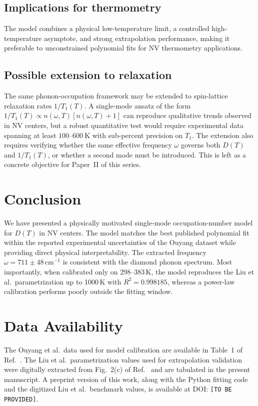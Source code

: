 \documentclass[12pt]{article}
\begin{document}
\subsection{Implications for thermometry}
The model combines a physical low-temperature limit, a controlled high-temperature asymptote, and strong extrapolation performance, making it preferable to unconstrained polynomial fits for NV thermometry applications.

\subsection{Possible extension to relaxation}
The same phonon-occupation framework may be extended to spin-lattice relaxation rates $1/T_1(T)$. A single-mode ansatz of the form $1/T_1(T) \propto n(\omega,T)[n(\omega,T)+1]$ can reproduce qualitative trends observed in NV centers, but a robust quantitative test would require experimental data spanning at least $100$--$600\ \text{K}$ with sub-percent precision on $T_1$. The extension also requires verifying whether the same effective frequency $\omega$ governs both $D(T)$ and $1/T_1(T)$, or whether a second mode must be introduced. This is left as a concrete objective for Paper~II of this series.

\section{Conclusion}
We have presented a physically motivated single-mode occupation-number model for $D(T)$ in NV centers. The model matches the best published polynomial fit within the reported experimental uncertainties of the Ouyang dataset while providing direct physical interpretability. The extracted frequency $\omega = 711 \pm 48\,\mathrm{cm}^{-1}$ is consistent with the diamond phonon spectrum. Most importantly, when calibrated only on 298--383\,K, the model reproduces the Liu et al.\ parametrization up to 1000\,K with $R^2 = 0.998185$, whereas a power-law calibration performs poorly outside the fitting window.

\section*{Data Availability}
The Ouyang et al.\ data used for model calibration are available in Table~1 of Ref.~\citep{ouyang2024}. The Liu et al.\ parametrization values used for extrapolation validation were digitally extracted from Fig.~2(c) of Ref.~\citep{liu2019} and are tabulated in the present manuscript. A preprint version of this work, along with the Python fitting code and the digitized Liu et al.\ benchmark values, is available at DOI: \texttt{[TO BE PROVIDED]}.
\end{document}
